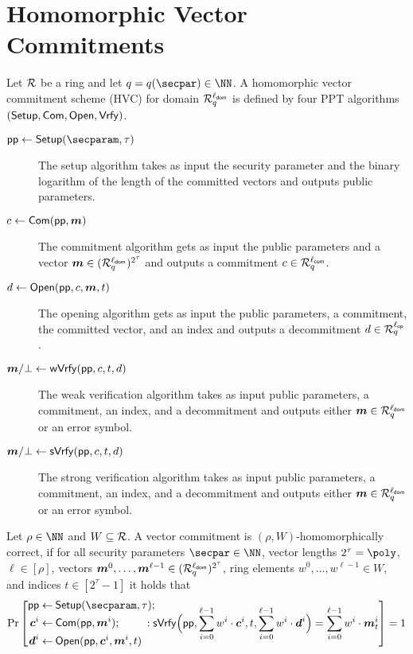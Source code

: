 \section{Homomorphic Vector Commitments}\label{sec:veccom}

\begin{definition}\label{def:hvc}
  Let $\mathcal{R}$ be a ring and let $q=q(\secpar)\in\NN$.
  A homomorphic vector commitment scheme (HVC) for domain $\mathcal{R}^{\ell_{\mathsf{dom}}}_q$ is defined by four PPT algorithms $(\mathsf{Setup},\mathsf{Com},\allowbreak\mathsf{Open},\mathsf{Vrfy})$.
\begin{description}
    \item[$\params\gets\setup(\secparam,\tau)$] The setup algorithm takes as input the security parameter and the binary logarithm of the length of the committed vectors and outputs public parameters.
    \item[$c \gets \mathsf{Com}(\mathsf{pp},\boldsymbol{m})$] The commitment algorithm gets as input the public parameters and a vector $\boldsymbol{m}\in(\mathcal{R}_q^{\ell_{\mathsf{dom}}})^{2^\tau}$ and outputs a commitment $c\in\mathcal{R}_q^{\ell_{\mathsf{com}}}$.
    \item[$d \gets \mathsf{Open}(\mathsf{pp},c,\boldsymbol{m},t)$] The opening algorithm gets as input the public parameters, a commitment, the committed vector, and an index and outputs a decommitment $d\in\mathcal{R}_q^{{\ell_{\mathsf{op}}}}$.
    \item[$\boldsymbol{m}/\bot\gets \mathsf{wVrfy}(\mathsf{pp},c,t,d)$] The weak verification algorithm takes as input public parameters, a commitment, an index, and a decommitment and outputs either $\boldsymbol{m}\in\mathcal{R}^{\ell_{\mathsf{dom}}}_q$ or an error symbol.
    \item[$\boldsymbol{m}/\bot\gets \mathsf{sVrfy}(\mathsf{pp},c,t,d)$] The strong verification algorithm takes as input public parameters, a commitment, an index, and a decommitment and outputs either $\boldsymbol{m}\in\mathcal{R}^{\ell_{\mathsf{dom}}}_q$ or an error symbol.
  \end{description}
  Let $\rho\in\NN$ and $W\subseteq\mathcal{R}$.
  A vector commitment is $(\rho,W)$-homomorphically correct, if for all security parameters $\secpar\in\NN$, vector lengths $2^\tau=\poly$, $\ell\in[\rho]$, vectors $\boldsymbol{m}^0,\dots,\boldsymbol{m}^{\ell-1}\in(\mathcal{R}_q^{\ell_{\mathsf{dom}}})^{2^\tau}$, ring elements $w^0,\dots,w^{\ell-1}\in W$, and indices $t\in[2^\tau-1]$ it holds that
  \[
    \Pr\left[
      \begin{aligned}
      \params\gets&\mspace{\medmuskip}\setup(\secparam,\tau);\\
      \vec{c}^i \gets&\mspace{\medmuskip} \commit(\params,\vec{m}^i);\\
      \vec{d}^i \gets&\mspace{\medmuskip} \open(\params,\vec{c}^i,\vec{m}^i,t)\\
      \end{aligned}\!\!\!\!\!\!:
      \sverify\Bigl(\params,\sum_{i=0}^{\ell-1}w^i\cdot \vec{c}^i,t,\sum_{i=0}^{\ell-1}w^i\cdot \vec{d}^i\Bigr) = \sum_{i=0}^{\ell-1}w^i\cdot\vec{m}^i_{t}
    \right]=1
  \]
\end{definition}
